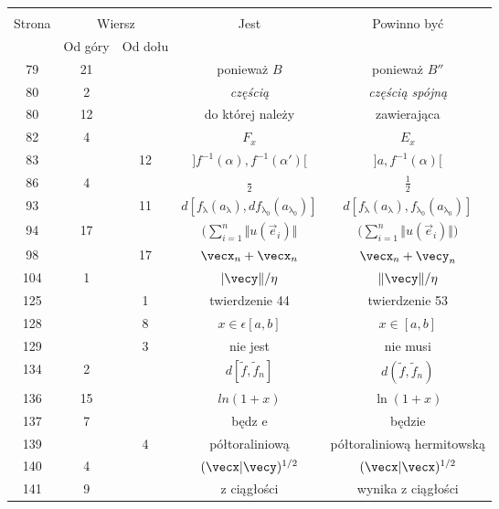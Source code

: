 \documentclass[a4paper,11pt]{article}
\numberwithin{equation}{section}
\renewcommand{\lambda}{\uplambda}
\begin{document}
\begin{center}
  \begin{tabular}{|c|c|c|c|c|}
    \hline
    & \multicolumn{2}{c|}{} & & \\
    Strona & \multicolumn{2}{c|}{Wiersz} & Jest
                              & Powinno być \\ \cline{2-3}
    & Od góry & Od dołu & & \\
    \hline
    79  & 21 & & ponieważ $B$ & ponieważ $B''$ \\
    80  &  2 & & \textit{częścią} & \textit{częścią spójną} \\
    80  & 12 & & do której należy & zawierająca \\
    82  &  4 & & $F_{ x }$ & $E_{ x }$ \\
    83  & & 12 & $] f^{ - 1 }( \alpha ), f^{ -1 }( \alpha' ) [$
           & $] a, f^{ -1 }( \alpha ) [$ \\
    86  &  4 & & $\frac{ {} }{ 2 }$ & $\frac{ 1 }{ 2 }$ \\
    93  & & 11 & $d[ f_{ \lambda }( a_{ \lambda } ), df_{ \lambda_{ 0 } }( a_{ \lambda_{ 0 } } ) ]$
           & $d[ f_{ \lambda }( a_{ \lambda } ), f_{ \lambda_{ 0 } }( a_{ \lambda_{ 0 } } ) ]$ \\
    94  & 17 & & $\big( \sum_{ i = 1 }^{ n } \Vert u( \vec{ e }_{ i } ) \Vert$
           & $\big( \sum_{ i = 1 }^{ n } \Vert u( \vec{ e }_{ i } ) \Vert \big)$ \\
    98  & & 17 & $\vecx_{ n } + \vecx_{ n }$
           & $\vecx_{ n } + \vecy_{ n }$ \\
    104 &  1 & & $| \vecy \Vert / \eta$ & $\Vert \vecy \Vert / \eta$ \\
    125 & &  1 & twierdzenie 44 & twierdzenie 53 \\
    128 & &  8 & $x \in \epsilon [ a, b ]$ & $x \in [ a, b ]$ \\
    129 & &  3 & nie jest & nie musi \\
    134 &  2 & & $d[ \tilde{ f }, \tilde{ f }_{ n } ]$
           & $d( \tilde{ f }, \tilde{ f }_{ n } )$ \\
    136 & 15 & & $ln( 1 + x )$ & $\ln( 1 + x )$ \\
    137 &  7 & & będz e & będzie \\
    139 & &  4 & półtoraliniową & półtoraliniową hermitowską \\
    140 &  4 & & $( \vecx | \vecy )^{ 1 / 2 }$
           & $( \vecx | \vecx )^{ 1 / 2 }$ \\
    141 &  9 & & z ciągłości & wynika z ciągłości \\

\end{tabular}
\end{center}
\end{document}
